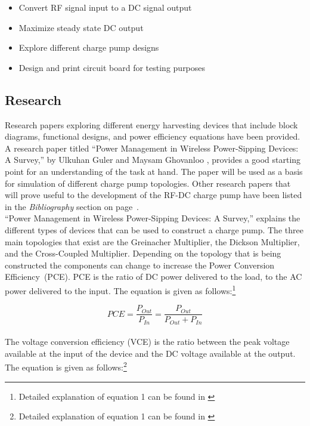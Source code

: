 \documentclass[12pt]{article}
\begin{document}
\begin{itemize}
	\item Convert RF signal input to a DC signal output
	\item Maximize steady state DC output
	\item Explore different charge pump designs
	\item Design and print circuit board for testing purposes
\end{itemize}
	
	\subsection{Research}
	Research papers exploring different energy harvesting devices that include block diagrams, functional designs, and power efficiency equations have been provided. A research paper titled ``Power Management in Wireless Power-Sipping Devices: A Survey,” by Ulkuhan Guler and Maysam Ghovanloo \cite{Guler}, provides a good starting point for an understanding of the task at hand. The paper will be used as a basis for simulation of different charge pump topologies. Other research papers that will prove useful to the development of the RF-DC charge pump have been listed in the \textit{Bibliography} section on page~\pageref{bibliography}.\\
	
	\noindent “Power Management in Wireless Power-Sipping Devices: A Survey,” explains the different types of devices that can be used to construct a charge pump. The three main topologies that exist are the Greinacher Multiplier, the Dickson Multiplier, and the Cross-Coupled Multiplier. Depending on the topology that is being constructed the components can change to increase the Power Conversion Efficiency~(PCE). PCE is the ratio of DC power delivered to the load, to the AC power delivered to the input. The equation is given as follows:\footnote{Detailed explanation of equation 1 can be found in \cite{Guler}}
	
\begin{equation}
PCE = \frac{P_{Out}}{P_{In}} = \frac{P_{Out}}{P_{Out} + P_{In}}\label{eq:PCE}
\end{equation}
\vspace{1em}
\\
The voltage conversion efficiency (VCE) is the ratio between the peak voltage available at the input of the device and the DC voltage available at the output. The equation is given as follows:\footnote{Detailed explanation of equation 1 can be found in \cite{Guler}}
\end{document}
